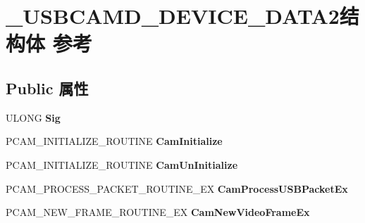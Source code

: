 \hypertarget{struct___u_s_b_c_a_m_d___d_e_v_i_c_e___d_a_t_a2}{}\section{\+\_\+\+U\+S\+B\+C\+A\+M\+D\+\_\+\+D\+E\+V\+I\+C\+E\+\_\+\+D\+A\+T\+A2结构体 参考}
\label{struct___u_s_b_c_a_m_d___d_e_v_i_c_e___d_a_t_a2}
\subsection*{Public 属性}
\begin{DoxyCompactItemize}
\item 
\mbox{\label{struct___u_s_b_c_a_m_d___d_e_v_i_c_e___d_a_t_a2_a913b5b0fca4b8787a18f8184978effe1}} 
U\+L\+O\+NG {\bfseries Sig}
\item 
\mbox{\label{struct___u_s_b_c_a_m_d___d_e_v_i_c_e___d_a_t_a2_a2cc3418b43c8cf88378a17e459a3e24d}} 
P\+C\+A\+M\+\_\+\+I\+N\+I\+T\+I\+A\+L\+I\+Z\+E\+\_\+\+R\+O\+U\+T\+I\+NE {\bfseries Cam\+Initialize}
\item 
\mbox{\label{struct___u_s_b_c_a_m_d___d_e_v_i_c_e___d_a_t_a2_ab0de54f6507778c0300bbd674c72adff}} 
P\+C\+A\+M\+\_\+\+I\+N\+I\+T\+I\+A\+L\+I\+Z\+E\+\_\+\+R\+O\+U\+T\+I\+NE {\bfseries Cam\+Un\+Initialize}
\item 
\mbox{\label{struct___u_s_b_c_a_m_d___d_e_v_i_c_e___d_a_t_a2_a8b7d7a1eff43726c9d7fb5658eaf71da}} 
P\+C\+A\+M\+\_\+\+P\+R\+O\+C\+E\+S\+S\+\_\+\+P\+A\+C\+K\+E\+T\+\_\+\+R\+O\+U\+T\+I\+N\+E\+\_\+\+EX {\bfseries Cam\+Process\+U\+S\+B\+Packet\+Ex}
\item 
\mbox{\label{struct___u_s_b_c_a_m_d___d_e_v_i_c_e___d_a_t_a2_a02625b1613a94364444219162e6e0379}} 
P\+C\+A\+M\+\_\+\+N\+E\+W\+\_\+\+F\+R\+A\+M\+E\+\_\+\+R\+O\+U\+T\+I\+N\+E\+\_\+\+EX {\bfseries Cam\+New\+Video\+Frame\+Ex}
\item 
\mbox{\label{struct___u_s_b_c_a_m_d___d_e_v_i_c_e___d_a_t_a2_a3ecdb0cfac21de944b35f1cdc03a9148}} 

\end{DoxyCompactItemize}
